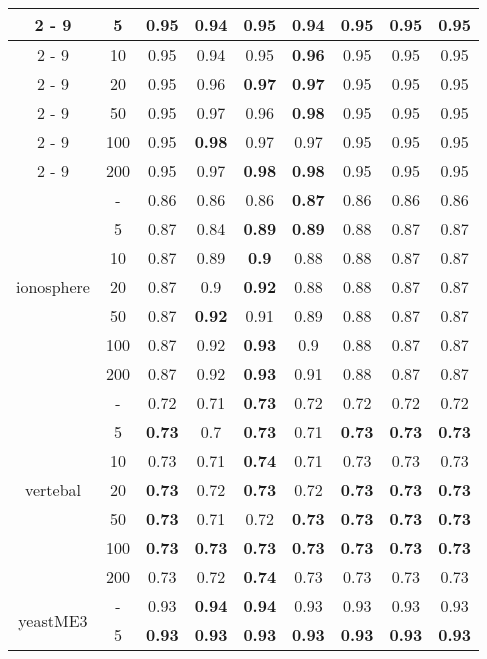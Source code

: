 \documentclass{article}%
\begin{document}
\begin{longtable}{c|c|ccccccc}
\cline{2%
-%
9}%
&5&\textbf{0.95}&0.94&\textbf{0.95}&0.94&\textbf{0.95}&\textbf{0.95}&\textbf{0.95}\\%
\cline{2%
-%
9}%
&10&0.95&0.94&0.95&\textbf{0.96}&0.95&0.95&0.95\\%
\cline{2%
-%
9}%
&20&0.95&0.96&\textbf{0.97}&\textbf{0.97}&0.95&0.95&0.95\\%
\cline{2%
-%
9}%
&50&0.95&0.97&0.96&\textbf{0.98}&0.95&0.95&0.95\\%
\cline{2%
-%
9}%
&100&0.95&\textbf{0.98}&0.97&0.97&0.95&0.95&0.95\\%
\cline{2%
-%
9}%
&200&0.95&0.97&\textbf{0.98}&\textbf{0.98}&0.95&0.95&0.95\\%
\hline%
\multirow{7}{*}{ionosphere}&{-}&0.86&0.86&0.86&\textbf{0.87}&0.86&0.86&0.86\\%
\cline{2%
-%
9}%
&5&0.87&0.84&\textbf{0.89}&\textbf{0.89}&0.88&0.87&0.87\\%
\cline{2%
-%
9}%
&10&0.87&0.89&\textbf{0.9}&0.88&0.88&0.87&0.87\\%
\cline{2%
-%
9}%
&20&0.87&0.9&\textbf{0.92}&0.88&0.88&0.87&0.87\\%
\cline{2%
-%
9}%
&50&0.87&\textbf{0.92}&0.91&0.89&0.88&0.87&0.87\\%
\cline{2%
-%
9}%
&100&0.87&0.92&\textbf{0.93}&0.9&0.88&0.87&0.87\\%
\cline{2%
-%
9}%
&200&0.87&0.92&\textbf{0.93}&0.91&0.88&0.87&0.87\\%
\hline%
\multirow{7}{*}{vertebal}&{-}&0.72&0.71&\textbf{0.73}&0.72&0.72&0.72&0.72\\%
\cline{2%
-%
9}%
&5&\textbf{0.73}&0.7&\textbf{0.73}&0.71&\textbf{0.73}&\textbf{0.73}&\textbf{0.73}\\%
\cline{2%
-%
9}%
&10&0.73&0.71&\textbf{0.74}&0.71&0.73&0.73&0.73\\%
\cline{2%
-%
9}%
&20&\textbf{0.73}&0.72&\textbf{0.73}&0.72&\textbf{0.73}&\textbf{0.73}&\textbf{0.73}\\%
\cline{2%
-%
9}%
&50&\textbf{0.73}&0.71&0.72&\textbf{0.73}&\textbf{0.73}&\textbf{0.73}&\textbf{0.73}\\%
\cline{2%
-%
9}%
&100&\textbf{0.73}&\textbf{0.73}&\textbf{0.73}&\textbf{0.73}&\textbf{0.73}&\textbf{0.73}&\textbf{0.73}\\%
\cline{2%
-%
9}%
&200&0.73&0.72&\textbf{0.74}&0.73&0.73&0.73&0.73\\%
\hline%
\multirow{7}{*}{yeastME3}&{-}&0.93&\textbf{0.94}&\textbf{0.94}&0.93&0.93&0.93&0.93\\%
\cline{2%
-%
9}%
&5&\textbf{0.93}&\textbf{0.93}&\textbf{0.93}&\textbf{0.93}&\textbf{0.93}&\textbf{0.93}&\textbf{0.93}\\%

\end{longtable}
\end{document}

